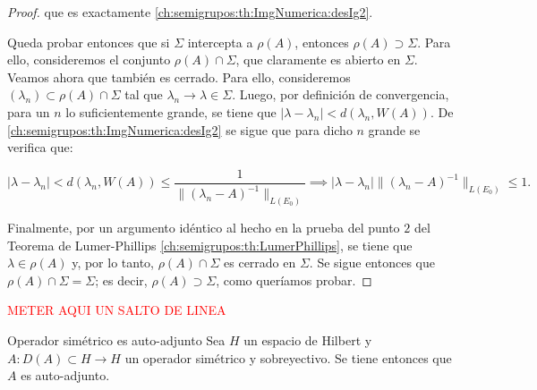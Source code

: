 \begin{proof}
    que es exactamente \ref{ch:semigrupos:th:ImgNumerica:desIg2}.

    Queda probar entonces que si $\Sigma$ intercepta a $\rho(A)$, entonces $\rho(A) \supset \Sigma$. Para ello, consideremos el conjunto $\rho(A) \cap \Sigma$, que claramente es abierto en $\Sigma$. Veamos ahora que también es cerrado. Para ello, consideremos $(\lambda_n) \subset \rho(A) \cap \Sigma$ tal que $\lambda_n \rightarrow \lambda \in \Sigma$. Luego, por definición de convergencia, para un $n$ lo suficientemente grande, se tiene que $|\lambda - \lambda_n | < d(\lambda_n, W(A))$. De \ref{ch:semigrupos:th:ImgNumerica:desIg2} se sigue que para dicho $n$ grande se verifica que:

    \[|\lambda - \lambda_n| < d(\lambda_n, W(A)) \leq  \frac{1}{\lVert(\lambda_n -A)^{-1} \rVert_{L(E_0)}} \implies |\lambda - \lambda_n| \lVert(\lambda_n -A)^{-1} \rVert_{L(E_0)} \leq 1.\]

    Finalmente, por un argumento idéntico al hecho en la prueba del punto $2$ del Teorema de Lumer-Phillips \ref{ch:semigrupos:th:LumerPhillips}, se tiene que $\lambda \in \rho(A)$ y, por lo tanto, $\rho(A) \cap \Sigma$ es cerrado en $\Sigma$. Se sigue entonces que $\rho(A) \cap \Sigma = \Sigma$; es decir, $\rho(A) \supset \Sigma$, como queríamos probar.
\end{proof}

\textcolor{red}{METER AQUI UN SALTO DE LINEA}\\

\begin{Proposicion}{}{Operador simétrico es auto-adjunto}
    Sea $H$ un espacio de Hilbert y $A : D(A) \subset H \rightarrow H$ un operador simétrico y sobreyectivo. Se tiene entonces que $A$ es auto-adjunto.
\end{Proposicion}

